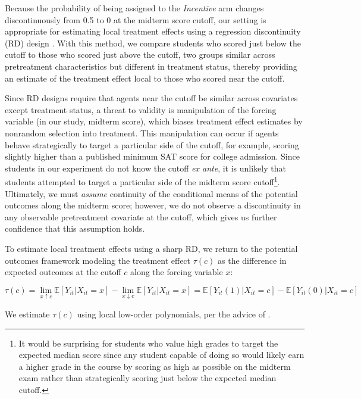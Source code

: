 \documentclass[12pt]{article}
\begin{document}
Because the probability of being assigned to the \textit{Incentive} arm changes discontinuously from 0.5 to 0 at the midterm score cutoff, our setting is appropriate for estimating local treatment effects using a regression discontinuity (RD) design \citep{tc1960, ap2008, il2008}. With this method, we compare students who scored just below the cutoff to those who scored just above the cutoff, two groups similar across pretreatment characteristics but different in treatment status, thereby providing an estimate of the treatment effect local to those who scored near the cutoff.

Since RD designs require that agents near the cutoff be similar across covariates except treatment status, a threat to validity is manipulation of the forcing variable (in our study, midterm score), which biases treatment effect estimates by nonrandom selection into treatment. This manipulation can occur if agents behave strategically to target a particular side of the cutoff, for example, scoring slightly higher than a published minimum SAT score for college admission. Since students in our experiment do not know the cutoff \textit{ex ante}, it is unlikely that students attempted to target a particular side of the midterm score cutoff\footnote{It would be surprising for students who value high grades to target the expected median score since any student capable of doing so would likely earn a higher grade in the course by scoring as high as possible on the midterm exam rather than strategically scoring just below the expected median cutoff.}. Ultimately, we must \textit{assume} continuity of the conditional means of the potential outcomes along the midterm score; however, we do not observe a discontinuity in any observable pretreatment covariate at the cutoff, which gives us further confidence that this assumption holds.

To estimate local treatment effects using a sharp RD, we return to the potential outcomes framework modeling the treatment effect $\tau(c)$ as the difference in expected outcomes at the cutoff $c$ along the forcing variable $x$:

\begin{equation} \label{rd_po}
	\tau(c) = \lim_{x \uparrow c} \mathbb{E}[Y_{it} | X_{it} = x] - \lim_{x \downarrow c} \mathbb{E}[Y_{it} | X_{it} = x] = \mathbb{E}[Y_{it}(1) | X_{it} = c] - \mathbb{E}[Y_{it}(0) | X_{it} = c]
\end{equation}

We estimate $\tau(c)$ using local low-order polynomials, per the advice of \textcite{gi2019}.
\end{document}
